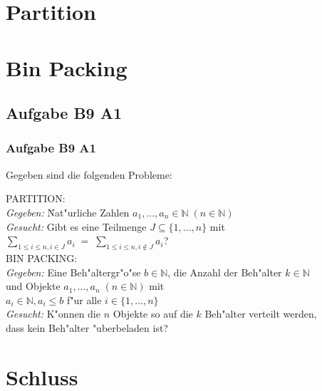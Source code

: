 \section{Partition}

\section{Bin Packing}
\subsection{Aufgabe B9 A1}
\begin{frame}
	\frametitle{Aufgabe B9 A1}
	Gegeben sind die folgenden Probleme:
	\begin{tabbing}
	PARTITION:\\
	\textit{Gegeben:} \= Nat"urliche Zahlen $a_1,...,a_n \in \mathbb{N} \; (n \in
	\mathbb{N})$\\
	\textit{Gesucht:} \> Gibt es eine Teilmenge $J \subseteq \{1,...,n\}$ mit\\
	\> $\sum\limits_{1 \leq i \leq n, i \in J}a_i \; = \;
	\sum\limits_{1 \leq i \leq n, i \notin J}a_i$?\\[8pt]
	BIN PACKING:\\
	\textit{Gegeben:} \> Eine Beh"altergr"o"se $b \in \mathbb{N}$, die Anzahl der
	Beh"alter $k \in \mathbb{N}$\\
	\> und Objekte $a_1,...,a_n \; (n \in \mathbb{N})$ mit\\
	\> $a_i \in \mathbb{N}, a_i \leq b$ f"ur alle $i \in \{1,...,n\}$\\
	\textit{Gesucht:} \> K"onnen die $n$ Objekte so auf die $k$ Beh"alter verteilt
	werden,\\
	\> dass kein Beh"alter "uberbeladen ist?\\
	\end{tabbing}
\end{frame}

\section{Schluss}

